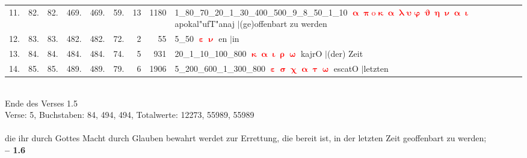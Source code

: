 \documentclass[a4paper,10pt,landscape]{article}
\begin{document}
\begin{tabular}{rrrrrrrrp{120mm}}
11.&82.&82.&469.&469.&59.&13&1180&1\_80\_70\_20\_1\_30\_400\_500\_9\_8\_50\_1\_10 \textcolor{red}{$\boldsymbol{\upalpha\uppi\mathrm{o}\upkappa\upalpha\uplambda\upsilon\upvarphi\upvartheta\upeta\upnu\upalpha\upiota}$} apokal"ufT"anaj $|$(ge)offenbart zu werden\\
12.&83.&83.&482.&482.&72.&2&55&5\_50 \textcolor{red}{$\boldsymbol{\upepsilon\upnu}$} en $|$in\\
13.&84.&84.&484.&484.&74.&5&931&20\_1\_10\_100\_800 \textcolor{red}{$\boldsymbol{\upkappa\upalpha\upiota\uprho\upomega}$} kajrO $|$(der) Zeit\\
14.&85.&85.&489.&489.&79.&6&1906&5\_200\_600\_1\_300\_800 \textcolor{red}{$\boldsymbol{\upepsilon\upsigma\upchi\upalpha\uptau\upomega}$} escatO $|$letzten\\
\end{tabular}\medskip \\
Ende des Verses 1.5\\
Verse: 5, Buchstaben: 84, 494, 494, Totalwerte: 12273, 55989, 55989\\
\\
die ihr durch Gottes Macht durch Glauben bewahrt werdet zur Errettung, die bereit ist, in der letzten Zeit geoffenbart zu werden;\\
\newpage 
{\bf -- 1.6}\\
\medskip \\
\end{document}

